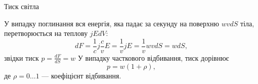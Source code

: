 \documentclass[onlytextwidth]{beamer}
\begin{document}
\begin{frame}{Тиск світла}{}
\begin{block}{}
		\begin{overprint}
			У випадку поглинання вся енергія, яка падає за секунду на поверхню $wv dS$ тіла, перетворюється на теплову $ jE dV $:
			\begin{equation*}
				dF = \frac1c j \frac{c}{v}E = \frac1vjE = \frac1v wvdS = w dS,
			\end{equation*}
			звідки тиск $ p = \frac{dF}{dS} = w $
			\onslide<2>
			У випадку часткового відбивання, тиск дорівнює
			\begin{equation*}
				p = w (1 + \rho),
			\end{equation*}
			де $ \rho = 0 \ldots 1$ --- коефіцієнт відбивання.
		\end{overprint}
	\end{block}
\end{frame}
\end{document}
